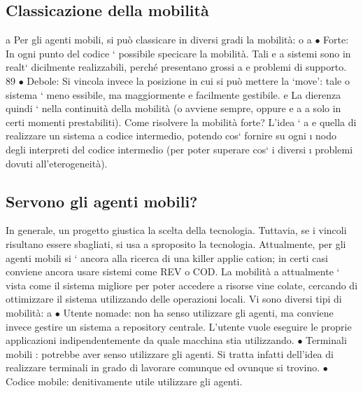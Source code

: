 \documentclass[a4paper,12pt]{article}
\begin{document}
\subsection{Classicazione della mobilità}
a
Per gli agenti mobili, si può classicare in diversi gradi la mobilità:
o
a
$\bullet$ Forte: In ogni punto del codice ` possibile specicare la mobilità. Tali
e
a
sistemi sono in realt` dicilmente realizzabili, perché presentano grossi
a
e
problemi di supporto.
89
$\bullet$ Debole: Si vincola invece la posizione in cui si può mettere la {`}move': tale
o
sistema ` meno essibile, ma maggiormente e facilmente gestibile.
e
La dierenza quindi ` nella continuità della mobilità (o avviene sempre, oppure
e
a
a
solo in certi momenti prestabiliti). Come risolvere la mobilità forte? L'idea `
a
e
quella di realizzare un sistema a codice intermedio, potendo cos` fornire su ogni
\i{}
nodo degli interpreti del codice intermedio (per poter superare cos` i diversi
\i{}
problemi dovuti all'eterogeneità).
\subsection{Servono gli agenti mobili?}
In generale, un progetto giustica la scelta della tecnologia. Tuttavia, se i vincoli
risultano essere sbagliati, si usa a sproposito la tecnologia.
Attualmente, per gli agenti mobili si ` ancora alla ricerca di una killer applie
cation; in certi casi conviene ancora usare sistemi come REV o COD. La mobilità
a
attualmente ` vista come il sistema migliore per poter accedere a risorse vine
colate, cercando di ottimizzare il sistema utilizzando delle operazioni locali. Vi
sono diversi tipi di mobilità:
a
$\bullet$ Utente nomade: non ha senso utilizzare gli agenti, ma conviene invece
gestire un sistema a repository centrale. L'utente vuole eseguire le proprie
applicazioni indipendentemente da quale macchina stia utilizzando.
$\bullet$ Terminali mobili : potrebbe aver senso utilizzare gli agenti. Si tratta infatti
dell'idea di realizzare terminali in grado di lavorare comunque ed ovunque
si trovino.
$\bullet$ Codice mobile: denitivamente utile utilizzare gli agenti.
\end{document}
